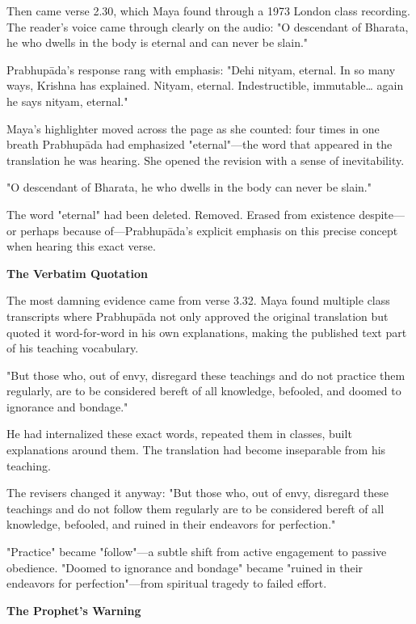 \documentclass[12pt,twoside]{book}
\begin{document}
Then came verse 2.30, which Maya found through a 1973 London class recording. The reader's voice came through clearly on the audio: "O descendant of Bharata, he who dwells in the body is eternal and can never be slain."

Prabhupāda's response rang with emphasis: "Dehi nityam, eternal. In so many ways, Krishna has explained. Nityam, eternal. Indestructible, immutable\ldots{} again he says nityam, eternal."

Maya's highlighter moved across the page as she counted: four times in one breath Prabhupāda had emphasized "eternal"—the word that appeared in the translation he was hearing. She opened the revision with a sense of inevitability.

"O descendant of Bharata, he who dwells in the body can never be slain."

The word "eternal" had been deleted. Removed. Erased from existence despite—or perhaps because of—Prabhupāda's explicit emphasis on this precise concept when hearing this exact verse.


\vspace{0.5cm}
\textbf{The Verbatim Quotation}
\vspace{0.2cm}


The most damning evidence came from verse 3.32. Maya found multiple class transcripts where Prabhupāda not only approved the original translation but quoted it word-for-word in his own explanations, making the published text part of his teaching vocabulary.

"But those who, out of envy, disregard these teachings and do not practice them regularly, are to be considered bereft of all knowledge, befooled, and doomed to ignorance and bondage."

He had internalized these exact words, repeated them in classes, built explanations around them. The translation had become inseparable from his teaching.

The revisers changed it anyway: "But those who, out of envy, disregard these teachings and do not follow them regularly are to be considered bereft of all knowledge, befooled, and ruined in their endeavors for perfection."

"Practice" became "follow"—a subtle shift from active engagement to passive obedience. "Doomed to ignorance and bondage" became "ruined in their endeavors for perfection"—from spiritual tragedy to failed effort.


\vspace{0.5cm}
\textbf{The Prophet's Warning}
\vspace{0.2cm}
\end{document}
